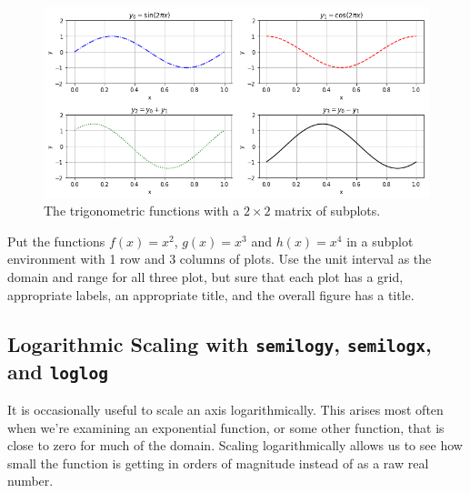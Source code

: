 \begin{figure}[ht!]
    \centering
    \includegraphics[width=0.95\columnwidth]{Images/matplotlib_3.png}
    \caption{The trigonometric functions with a $2\times 2$ matrix of subplots.}
    \label{fig:matplotlib_3}
\end{figure}

\begin{problem}
    Put the functions $f(x) = x^2$, $g(x) = x^3$ and $h(x) = x^4$ in a subplot environment with 1 row and 3 columns of plots.  Use the unit interval as the domain and range for all three plot, but sure that each plot has a grid, appropriate labels, an appropriate title, and the overall figure has a title.
\end{problem}


\subsection{Logarithmic Scaling with \texttt{semilogy}, \texttt{semilogx}, and
\texttt{loglog}}
It is occasionally useful to scale an axis logarithmically.  This arises most often when
we're examining an exponential function, or some other function, that is close to zero for
much of the domain.  Scaling logarithmically allows us to see how small the function is
getting in orders of magnitude instead of as a raw real number.

